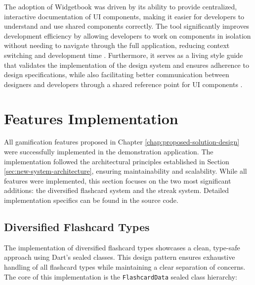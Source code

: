 The adoption of Widgetbook was driven by its ability to provide centralized, interactive documentation of UI components, making it easier for developers to understand and use shared components correctly. The tool significantly improves development efficiency by allowing developers to work on components in isolation without needing to navigate through the full application, reducing context switching and development time \cite{cite:widgetbook_efficiency}. Furthermore, it serves as a living style guide that validates the implementation of the design system and ensures adherence to design specifications, while also facilitating better communication between designers and developers through a shared reference point for UI components \cite{cite:design_system_validation}.

\section{Features Implementation}
\label{sec:features-implementation}

All gamification features proposed in Chapter \ref{chap:proposed-solution-design} were successfully implemented in the demonstration application. The implementation followed the architectural principles established in Section \ref{sec:new-system-architecture}, ensuring maintainability and scalability. While all features were implemented, this section focuses on the two most significant additions: the diversified flashcard system and the streak system. Detailed implementation specifics can be found in the source code.

\subsection{Diversified Flashcard Types}

The implementation of diversified flashcard types showcases a clean, type-safe approach using Dart's sealed classes. This design pattern ensures exhaustive handling of all flashcard types while maintaining a clear separation of concerns. The core of this implementation is the \texttt{FlashcardData} sealed class hierarchy:

